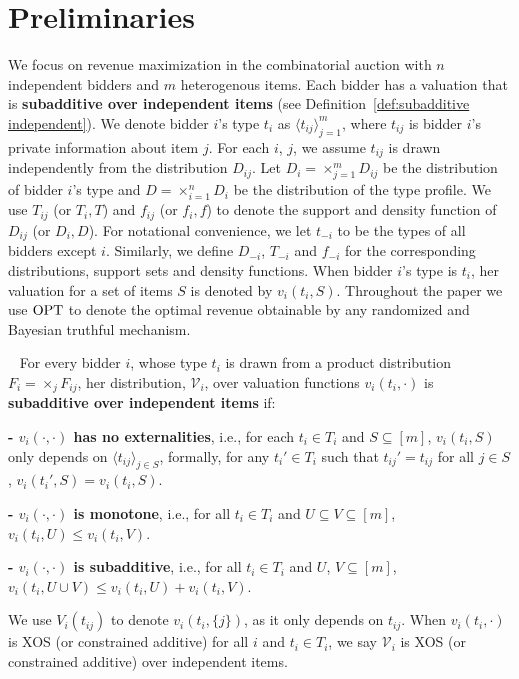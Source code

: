\section{Preliminaries}\label{sec:prelim}

We focus on revenue maximization in the combinatorial auction with $n$ independent bidders and $m$ heterogenous items. Each bidder has a valuation that is \textbf{subadditive over independent items} (see Definition~\ref{def:subadditive independent}). We denote bidder $i$'s type $t_i$ as $\langle t_{ij}\rangle_{j=1}^m$, where $t_{ij}$ is bidder $i$'s private information about item $j$. For each $i$, $j$, we assume $t_{ij}$ is drawn independently from the distribution $D_{ij}$. Let $D_i=\times_{j=1}^m D_{ij}$ be the distribution of bidder $i$'s type and $D=\times_{i=1}^n D_i$ be the distribution of the type profile. We use $T_{ij}$ (or $T_i, T$) and $f_{ij}$ (or $f_i, f$) to denote the support and density function of $D_{ij}$ (or $D_i, D$). For notational convenience, we let  $t_{-i}$ to be the types of all bidders except $i$. %
Similarly, we define $D_{-i}$, $T_{-i}$ 
  and $f_{-i}$ for the corresponding  distributions, support sets and density functions. When bidder $i$'s type is $t_i$, her valuation for a set of items $S$ is denoted by $v_i(t_i,S)$. Throughout the paper we use $\text{OPT}$ to denote the optimal revenue obtainable by any randomized and Bayesian truthful mechanism.
  
    \begin{definition}~\cite{RubinsteinW15}\label{def:subadditive independent}
For every bidder $i$, whose type $t_i$ is drawn from a product distribution $F_i=\times_j F_{ij}$, her distribution, $\mathcal{V}_i$, over valuation functions $v_i(t_i,\cdot)$ is \textbf{subadditive over independent items} if:

\vspace{.05in}
\noindent \textbf{- $v_i(\cdot,\cdot)$ has no externalities}, i.e., for each $t_i\in T_i$ and $S\subseteq [m]$, $v_i(t_i,S)$ only depends on $\langle t_{ij}\rangle_{j\in S}$, formally, for any $t_i'\in T_i$ such that $t_{ij}'=t_{ij}$ for all $j\in S$, $v_i(t_i',S)=v_i(t_i,S)$.

\vspace{.05in}
\noindent \textbf{- $v_i(\cdot,\cdot)$ is monotone}, i.e., for all $t_i\in T_i$ and $U\subseteq V\subseteq [m]$, $v_i(t_i,U)\leq v_i(t_i,V)$.

\vspace{.05in}
\noindent \textbf{- $v_i(\cdot,\cdot)$ is subadditive}, i.e., for all $t_i\in T_i$ and $U$, $V\subseteq [m]$, $v_i(t_i,U\cup V)\leq v_i(t_i,U)+ v_i(t_i,V)$.

\vspace{.05in}
 We use $V_i(t_{ij})$ to denote $v_i(t_i,\{j\})$, as it only depends on $t_{ij}$. When $v_i(t_i,\cdot)$ is XOS (or constrained additive) for all $i$ and $t_i\in T_i$, we say $\mathcal{V}_i$ is XOS (or constrained additive) over independent items.
\end{definition}


